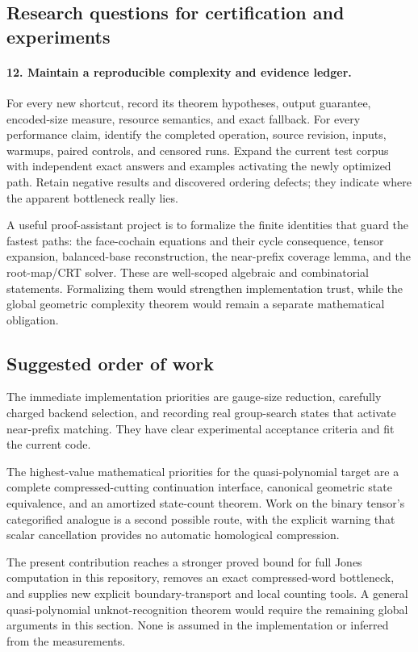 \subsection{Research questions for certification and experiments}

\paragraph{12. Maintain a reproducible complexity and evidence ledger.}
For every new shortcut, record its theorem hypotheses, output guarantee,
encoded-size measure, resource semantics, and exact fallback. For every
performance claim, identify the completed operation, source revision,
inputs, warmups, paired controls, and censored runs. Expand the current
test corpus with independent exact answers and examples activating the
newly optimized path. Retain negative results and discovered ordering
defects; they indicate where the apparent bottleneck really lies.

A useful proof-assistant project is to formalize the finite identities
that guard the fastest paths: the face-cochain equations and their cycle
consequence, tensor expansion, balanced-base reconstruction, the
near-prefix coverage lemma, and the root-map/CRT solver. These are
well-scoped algebraic and combinatorial statements. Formalizing them
would strengthen implementation trust, while the global geometric
complexity theorem would remain a separate mathematical obligation.

\subsection{Suggested order of work}

The immediate implementation priorities are gauge-size reduction,
carefully charged backend selection, and recording real group-search
states that activate near-prefix matching. They have clear experimental
acceptance criteria and fit the current code.

The highest-value mathematical priorities for the quasi-polynomial
target are a complete compressed-cutting continuation interface,
canonical geometric state equivalence, and an amortized state-count
theorem. Work on the binary tensor's categorified analogue is a second
possible route, with the explicit warning that scalar cancellation
provides no automatic homological compression.

The present contribution reaches a stronger proved bound for full Jones
computation in this repository, removes an exact compressed-word
bottleneck, and supplies new explicit boundary-transport and local
counting tools. A general quasi-polynomial unknot-recognition theorem
would require the remaining global arguments in this section. None is
assumed in the implementation or inferred from the measurements.
